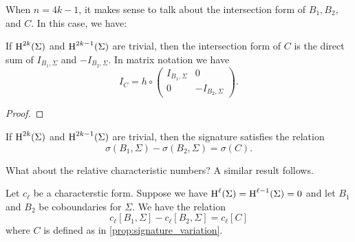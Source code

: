 
When $n=4k-1$, it makes sense to talk about the intersection form of $B_1,B_2,$ and $C$. In this case, we have:
\begin{proposition}\label{prop:signature_variation}
	If $\operatorname{H}^{2k}(\Sigma)$ and $\operatorname{H}^{2k-1}(\Sigma)$ are trivial, then the intersection form of $C$ is the direct sum of $I_{B_1,\Sigma}$ and $-I_{B_2,\Sigma}$. In matrix notation we have
	\[
		I_C = h\circ \begin{pmatrix} I_{B_1, \Sigma} & 0 \\ 0 & -I_{B_2, \Sigma}\end{pmatrix}.
	\]
\end{proposition}
\begin{proof}
\end{proof}

\begin{corollary}
	If $\operatorname{H}^{2k}(\Sigma)$ and $\operatorname{H}^{2k-1}(\Sigma)$ are trivial, then the signature satisfies the relation
	\begin{equation}\label{eq:signature_variation}
		\sigma(B_1, \Sigma) - \sigma(B_2, \Sigma) = \sigma(C).
	\end{equation}
\end{corollary}

What about the relative characteristic numbers? A similar result follows.
\begin{proposition}\label{prop:characteristic_form_variation}
	Let $c_\ell$ be a characterstic form. Suppose we have $\operatorname{H}^{\ell}(\Sigma)=\operatorname{H}^{\ell-1}(\Sigma)=0$ and
	let $B_1$ and $B_2$ be coboundaries for $\Sigma$. We have the relation
	\begin{equation}\label{eq:characteristic_number_variation}
		c_\ell[B_1, \Sigma] - c_\ell[B_2, \Sigma] = c_\ell[C]
	\end{equation}
	where $C$ is defined as in \cref{prop:signature_variation}.
\end{proposition}

